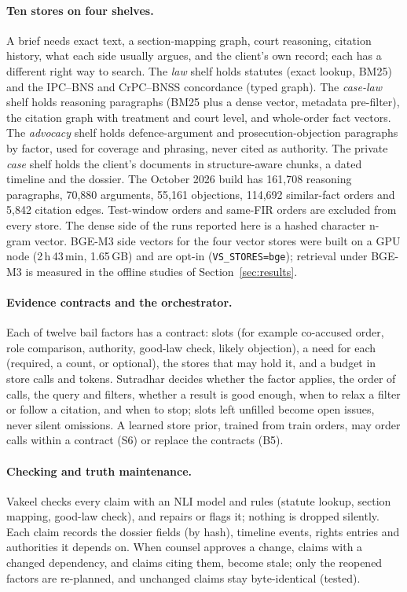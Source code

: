 \paragraph{Ten stores on four shelves.} A brief needs exact text, a section-mapping graph, court reasoning, citation history, what each side usually argues, and the client's own record; each has a different right way to search. The \emph{law} shelf holds statutes (exact lookup, BM25) and the IPC--BNS and CrPC--BNSS concordance (typed graph). The \emph{case-law} shelf holds reasoning paragraphs (BM25 plus a dense vector, metadata pre-filter), the citation graph with treatment and court level, and whole-order fact vectors. The \emph{advocacy} shelf holds defence-argument and prosecution-objection paragraphs by factor, used for coverage and phrasing, never cited as authority. The private \emph{case} shelf holds the client's documents in structure-aware chunks, a dated timeline and the dossier. The October 2026 build has 161,708 reasoning paragraphs, 70,880 arguments, 55,161 objections, 114,692 similar-fact orders and 5,842 citation edges. Test-window orders and same-FIR orders are excluded from every store. The dense side of the runs reported here is a hashed character n-gram vector. BGE-M3 side vectors for the four vector stores were built on a GPU node (2\,h\,43\,min, 1.65\,GB) and are opt-in (\texttt{VS\_STORES=bge}); retrieval under BGE-M3 is measured in the offline studies of Section~\ref{sec:results}.

\paragraph{Evidence contracts and the orchestrator.} Each of twelve bail factors has a contract: slots (for example co-accused order, role comparison, authority, good-law check, likely objection), a need for each (required, a count, or optional), the stores that may hold it, and a budget in store calls and tokens. Sutradhar decides whether the factor applies, the order of calls, the query and filters, whether a result is good enough, when to relax a filter or follow a citation, and when to stop; slots left unfilled become open issues, never silent omissions. A learned store prior, trained from train orders, may order calls within a contract (S6) or replace the contracts (B5).

\paragraph{Checking and truth maintenance.} Vakeel checks every claim with an NLI model and rules (statute lookup, section mapping, good-law check), and repairs or flags it; nothing is dropped silently. Each claim records the dossier fields (by hash), timeline events, rights entries and authorities it depends on. When counsel approves a change, claims with a changed dependency, and claims citing them, become stale; only the reopened factors are re-planned, and unchanged claims stay byte-identical (tested).

